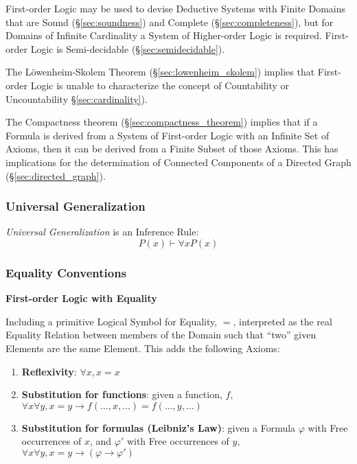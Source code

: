 First-order Logic may be used to devise Deductive Systems with Finite
Domains that are Sound (\S\ref{sec:soundness}) and Complete
(\S\ref{sec:completeness}), but for Domains of Infinite Cardinality a
System of Higher-order Logic is required. First-order Logic is
Semi-decidable (\S\ref{sec:semidecidable}).

The L\"owenheim-Skolem Theorem (\S\ref{sec:lowenheim_skolem}) implies
that First-order Logic is unable to characterize the concept of
Countability or Uncountability \S\ref{sec:cardinality}).

The Compactness theorem (\S\ref{sec:compactness_theorem}) implies that
if a Formula is derived from a System of First-order Logic with an
Infinite Set of Axioms, then it can be derived from a Finite Subset of
those Axioms. This has implications for the determination of Connected
Components of a Directed Graph (\S\ref{sec:directed_graph}).



\subsubsection{Universal Generalization}\label{sec:universal_generalization}

\emph{Universal Generalization} is an Inference Rule:
\[P(x) \vdash \forall x P(x)\]



\subsubsection{Equality Conventions}\label{sec:firstorder_equality}

\textbf{First-order Logic with Equality}

Including a primitive Logical Symbol for Equality, $=$, interpreted
as the real Equality Relation between members of the Domain such that
``two'' given Elements are the same Element. This adds the following
Axioms:

\begin{enumerate}
\item \textbf{Reflexivity}: $\forall x, x=x$
\item \textbf{Substitution for functions}: given a function, $f$,
  $\forall x \forall y, x = y \rightarrow f(\ldots,x,\ldots) =
  f(\ldots,y,\ldots)$
\item \textbf{Substitution for formulas (Leibniz's Law)}: given a
  Formula $\varphi$ with Free occurrences of $x$, and $\varphi '$ with
  Free occurrences of $y$, $\forall x \forall y, x = y \rightarrow
  (\varphi \rightarrow \varphi ')$
\end{enumerate}

